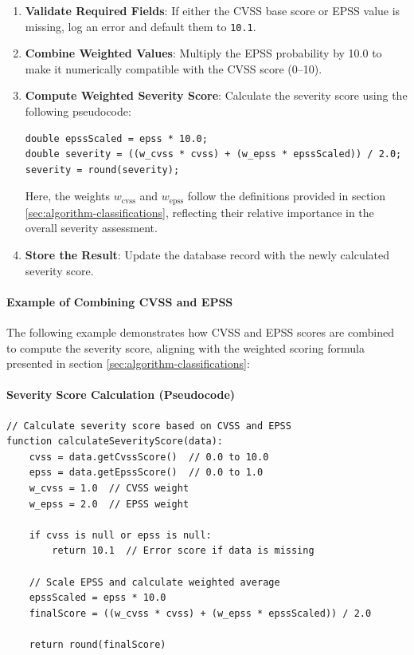 \begin{enumerate}
  \item \textbf{Validate Required Fields}: If either the \ac{CVSS} base score or \ac{EPSS} value is missing, log an error and default them to \texttt{10.1}.
  
  \item \textbf{Combine Weighted Values}: Multiply the \ac{EPSS} probability by 10.0 to make it numerically compatible with the \ac{CVSS} score (0--10).

  \item \textbf{Compute Weighted Severity Score}: Calculate the severity score using the following pseudocode:

  \begin{verbatim}
double epssScaled = epss * 10.0;
double severity = ((w_cvss * cvss) + (w_epss * epssScaled)) / 2.0;
severity = round(severity);
  \end{verbatim}

  Here, the weights \( w_{\text{cvss}} \) and \( w_{\text{epss}} \) follow the definitions provided in section \ref{sec:algorithm-classifications}, reflecting their relative importance in the overall severity assessment.

  \item \textbf{Store the Result}: Update the database record with the newly calculated severity score.
\end{enumerate}

\paragraph{Example of Combining \ac{CVSS} and \ac{EPSS}}
\label{par:cvss-epss-combination}
The following example demonstrates how \ac{CVSS} and \ac{EPSS} scores are combined to compute the severity score, aligning with the weighted scoring formula presented in section \ref{sec:algorithm-classifications}:
\noindent
\paragraph{Severity Score Calculation (Pseudocode)}
\label{par:severity-score-calculation}

\begin{verbatim}
// Calculate severity score based on CVSS and EPSS
function calculateSeverityScore(data):
    cvss = data.getCvssScore()  // 0.0 to 10.0
    epss = data.getEpssScore()  // 0.0 to 1.0
    w_cvss = 1.0  // CVSS weight
    w_epss = 2.0  // EPSS weight

    if cvss is null or epss is null:
        return 10.1  // Error score if data is missing

    // Scale EPSS and calculate weighted average
    epssScaled = epss * 10.0
    finalScore = ((w_cvss * cvss) + (w_epss * epssScaled)) / 2.0

    return round(finalScore)
\end{verbatim}



